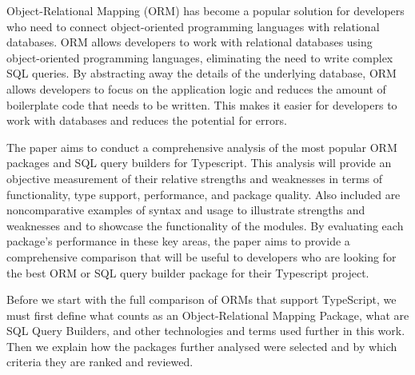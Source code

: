 Object-Relational Mapping (ORM) has become a popular solution for developers who need to connect object-oriented programming languages with relational databases. ORM allows developers to work with relational databases using object-oriented programming languages, eliminating the need to write complex SQL queries. By abstracting away the details of the underlying database, ORM allows developers to focus on the application logic and reduces the amount of boilerplate code that needs to be written. This makes it easier for developers to work with databases and reduces the potential for errors. \par
The paper aims to conduct a comprehensive analysis of the most popular ORM packages and SQL query builders for Typescript. This analysis will provide an objective measurement of their relative strengths and weaknesses in terms of functionality, type support, performance, and package quality. Also included are noncomparative examples of syntax and usage to illustrate strengths and weaknesses and to showcase the functionality of the modules. By evaluating each package's performance in these key areas, the paper aims to provide a comprehensive comparison that will be useful to developers who are looking for the best ORM or SQL query builder package for their Typescript project.\par
Before we start with the full comparison of ORMs that support TypeScript, we must first define what counts as an Object-Relational Mapping Package, what are SQL Query Builders, and other technologies and terms used further in this work. Then we explain how the packages further analysed were selected and by which criteria they are ranked and reviewed.\par

